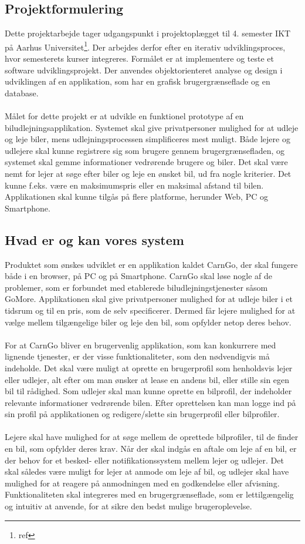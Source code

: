 \documentclass[Rapport/Rapport_main.tex]{subfiles}
\begin{document}
\subsection{Projektformulering}
Dette projektarbejde tager udgangspunkt i projektoplægget til 4. semester IKT på Aarhus Universitet\footnote{ref}. Der arbejdes derfor efter en iterativ udviklingsproces, hvor semesterets kurser integreres. Formålet er at implementere og teste et software udviklingsprojekt. Der anvendes objektorienteret analyse og design i udviklingen af en applikation, som har en grafisk brugergrænseflade og en database.\\\\Målet for dette projekt er at udvikle en funktionel prototype af en biludlejningsapplikation. Systemet skal give privatpersoner mulighed for at udleje og leje biler, mens udlejningsprocessen simplificeres mest muligt. Både lejere og udlejere skal kunne registrere sig som brugere gennem brugergrænsefladen, og systemet skal gemme informationer vedrørende brugere og biler. Det skal være nemt for lejer at søge efter biler og leje en ønsket bil, ud fra nogle kriterier. Det kunne f.eks. være en maksimumspris eller en maksimal afstand til bilen. Applikationen skal kunne tilgås på flere platforme, herunder Web, PC og Smartphone.

\subsection{Hvad er og kan vores system} 
Produktet som ønskes udviklet er en applikation kaldet CarnGo, der skal fungere både i en browser, på PC og på Smartphone. CarnGo skal løse nogle af de problemer, som er forbundet med etablerede biludlejningstjenester såsom GoMore. Applikationen skal give privatpersoner mulighed for at udleje biler i et tidsrum og til en pris, som de selv specificerer. Dermed får lejere mulighed for at vælge mellem tilgængelige biler og leje den bil, som opfylder netop deres behov. \\\\For at CarnGo bliver en brugervenlig applikation, som kan konkurrere med lignende tjenester, er der visse funktionaliteter, som den nødvendigvis må indeholde. Det skal være muligt at oprette en brugerprofil som henholdsvis lejer eller udlejer, alt efter om man ønsker at lease en andens bil, eller stille sin egen bil til rådighed. Som udlejer skal man kunne oprette en bilprofil, der indeholder relevante informationer vedrørende bilen. Efter oprettelsen kan man logge ind på sin profil på applikationen og redigere/slette sin brugerprofil eller bilprofiler.
\\\\Lejere skal have mulighed for at søge mellem de oprettede bilprofiler, til de finder en bil, som opfylder deres krav. Når der skal indgås en aftale om leje af en bil, er der behov for et besked- eller notifikationssystem mellem lejer og udlejer. Det skal således være muligt for lejer at anmode om leje af bil, og udlejer skal have mulighed for at reagere på anmodningen med en godkendelse eller afvisning.\\Funktionaliteten skal integreres med en brugergrænseflade, som er lettilgængelig og intuitiv at anvende, for at sikre den bedst mulige brugeroplevelse.
\end{document}
